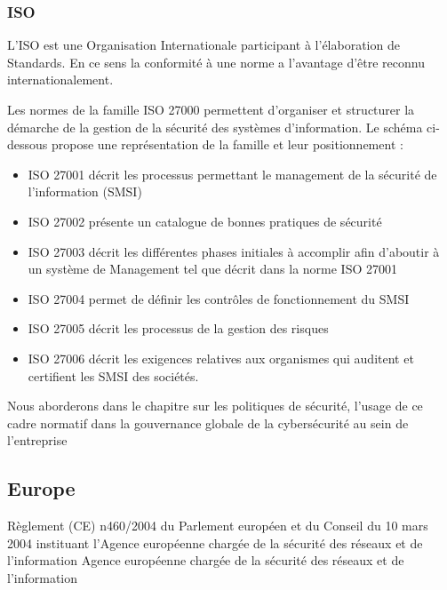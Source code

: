 \subsubsection{ISO}


L’ISO est une Organisation Internationale participant à l’élaboration de Standards. En ce sens la conformité à une norme a l’avantage d’être reconnu internationalement.
 
Les normes de la famille ISO 27000 permettent d’organiser et structurer la démarche de la gestion de la sécurité des systèmes d’information. Le schéma ci-dessous propose une représentation de la famille et leur positionnement : 

\begin{itemize}
  \item ISO 27001 décrit les processus permettant le management de la sécurité de l’information (SMSI)
  \item ISO 27002 présente un catalogue de bonnes pratiques de sécurité
  \item ISO 27003 décrit les différentes phases initiales à accomplir afin d’aboutir à un système de Management tel que décrit dans la norme ISO 27001
  \item ISO 27004 permet de définir les contrôles de fonctionnement du SMSI
  \item ISO 27005 décrit les processus de la gestion des risques
  \item ISO 27006 décrit les exigences relatives aux organismes qui auditent et certifient les SMSI des sociétés.
\end{itemize}

Nous aborderons dans le chapitre sur les politiques de sécurité, l'usage de ce cadre normatif dans la gouvernance globale de la cybersécurité au sein de l'entreprise


\subsection{Europe}

Règlement (CE) n460/2004 du Parlement européen et du Conseil
du 10 mars 2004
instituant l'Agence européenne chargée de la sécurité des réseaux et de l'information
Agence européenne chargée de la sécurité des réseaux et de l'information

